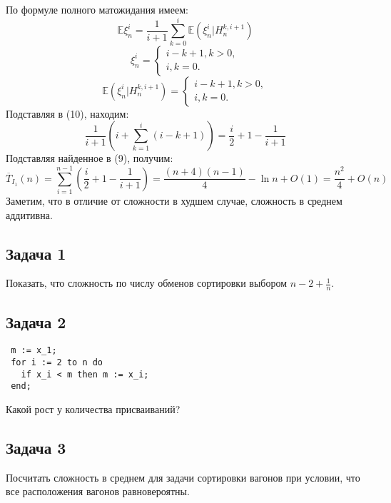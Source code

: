 \documentclass[11pt]{article}
\newcounter{th}\setcounter{th}{0}
\begin{document}
По формуле полного матожидания имеем:
\begin{equation}
\mathbb{E}\xi_n^i = \frac1{i + 1}\sum_{k = 0}^i\mathbb{E}(\xi_n^i | H_n^{k, i + 1})
\end{equation}
\begin{equation}
\xi_n^i = \begin{cases}
i - k + 1, k > 0, \\
i, k = 0.
\end{cases}
\end{equation}
\begin{equation}
\mathbb{E}(\xi_n^i | H_n^{k, i + 1}) = \begin{cases}
i - k + 1, k > 0, \\
i, k = 0.
\end{cases}
\end{equation}
Подставляя в (10), находим:
\begin{equation}
\frac1{i + 1}\left(i + \sum_{k = 1}^i(i - k + 1)\right) = \frac{i}2 + 1 - \frac1{i + 1}
\end{equation}
Подставляя найденное в (9), получим:
\begin{equation}
\overline{T}_{I_1}(n) = \sum_{i = 1}^{n - 1}\left(\frac{i}2 + 1 - \frac1{i + 1}\right)
= \frac{(n + 4)(n - 1)}4 - \ln n + O(1) = \frac{n^2}4 + O(n)
\end{equation}
Заметим, что в отличие от сложности в худшем случае, сложность в среднем аддитивна.
\subsection{Задача 1}
\label{sec:org7caefb4}
Показать, что сложность по числу обменов сортировки выбором \(n - 2 + \frac1n\).
\subsection{Задача 2}
\label{sec:org51f8d4a}
\begin{lstlisting}
 m := x_1;
 for i := 2 to n do
   if x_i < m then m := x_i;
 end;
\end{lstlisting}
Какой рост у количества присваиваний?
\subsection{Задача 3}
\label{sec:org447913c}
Посчитать сложность в среднем для задачи сортировки вагонов при условии, что все расположения
вагонов равновероятны.
\end{document}
